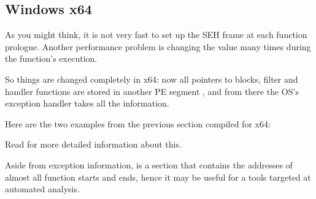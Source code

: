 \subsection{Windows x64}

\label{SEH_win64}

As you might think, it is not very fast to set up the SEH frame at each function prologue.
Another performance problem is changing the 
 value many times during the function's execution.

So things are changed completely in x64: now all pointers to  blocks, filter and handler functions are stored
in another PE segment , 
and from there the \ac{OS}'s exception handler takes all the information.

Here are the two examples from the previous section compiled for x64:





Read \cite{IgorSkochinsky} for more detailed information about this.

Aside from exception information, 
is a section that contains the addresses of almost all function starts and ends,
hence it may be useful for a tools targeted at automated analysis.


